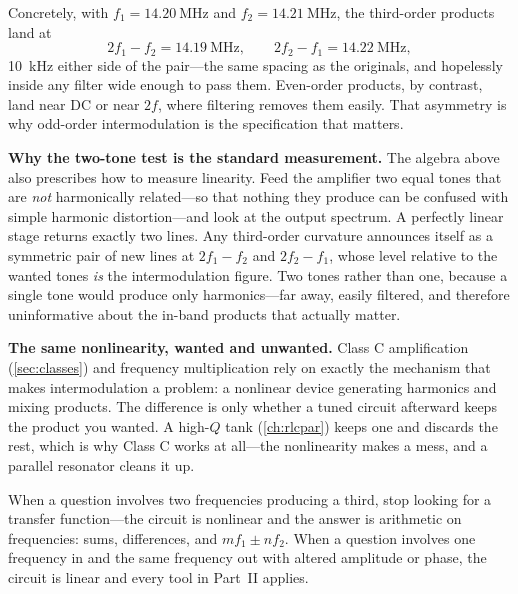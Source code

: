 Concretely, with \(f_1=\SI{14.20}{\mega\hertz}\) and \(f_2=\SI{14.21}{\mega\hertz}\),
the third-order products land at
\[
2f_1-f_2=\SI{14.19}{\mega\hertz},
\qquad
2f_2-f_1=\SI{14.22}{\mega\hertz},
\]
\SI{10}{\kilo\hertz} either side of the pair---the same spacing as the originals,
and hopelessly inside any filter wide enough to pass them. Even-order products, by
contrast, land near DC or near \(2f\), where filtering removes them easily. That
asymmetry is why odd-order intermodulation is the specification that matters.

\begin{physicalbox}
\textbf{Why the two-tone test is the standard measurement.} The algebra above also
prescribes how to measure linearity. Feed the amplifier two equal tones that are
\emph{not} harmonically related---so that nothing they produce can be confused with
simple harmonic distortion---and look at the output spectrum. A perfectly linear
stage returns exactly two lines. Any third-order curvature announces itself as a
symmetric pair of new lines at \(2f_1-f_2\) and \(2f_2-f_1\), whose level relative
to the wanted tones \emph{is} the intermodulation figure. Two tones rather than one,
because a single tone would produce only harmonics---far away, easily filtered, and
therefore uninformative about the in-band products that actually matter.
\end{physicalbox}

\begin{physicalbox}
\textbf{The same nonlinearity, wanted and unwanted.} Class C amplification
(\cref{sec:classes}) and frequency multiplication rely on exactly the mechanism that
makes intermodulation a problem: a nonlinear device generating harmonics and mixing
products. The difference is only whether a tuned circuit afterward keeps the product
you wanted. A high-\(Q\) tank (\cref{ch:rlcpar}) keeps one and discards the rest,
which is why Class C works at all---the nonlinearity makes a mess, and a parallel
resonator cleans it up.
\end{physicalbox}

\begin{exambox}
When a question involves two frequencies producing a third, stop looking for a
transfer function---the circuit is nonlinear and the answer is arithmetic on
frequencies: sums, differences, and \(mf_1\pm nf_2\). When a question involves one
frequency in and the same frequency out with altered amplitude or phase, the circuit
is linear and every tool in Part~II applies.
\end{exambox}

